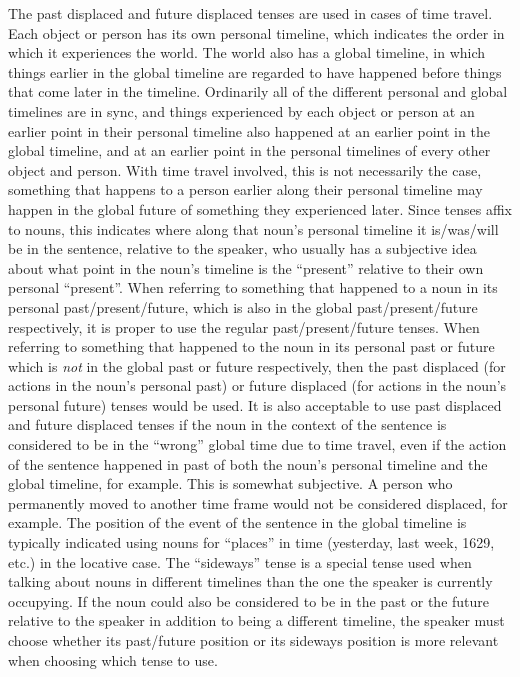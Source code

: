 \documentclass{article}
\begin{document}
The past displaced and future displaced tenses are used in cases of time travel.  Each object or person has its own personal timeline, which indicates the order in which it experiences the world.  The world also has a global timeline, in which things earlier in the global timeline are regarded to have happened before things that come later in the timeline.  Ordinarily all of the different personal and global timelines are in sync, and things experienced by each object or person at an earlier point in their personal timeline also happened at an earlier point in the global timeline, and at an earlier point in the personal timelines of every other object and person.  With time travel involved, this is not necessarily the case, something that happens to a person earlier along their personal timeline may happen in the global future of something they experienced later.  Since tenses affix to nouns, this indicates where along that noun's personal timeline it is/was/will be in the sentence, relative to the speaker, who usually has a subjective idea about what point in the noun's timeline is the ``present'' relative to their own personal ``present''.  When referring to something that happened to a noun in its personal past/present/future, which is also in the global past/present/future respectively, it is proper to use the regular past/present/future tenses.  When referring to something that happened to the noun in its personal past or future which is \emph{not} in the global past or future respectively, then the past displaced (for actions in the noun's personal past) or future displaced (for actions in the noun's personal future) tenses would be used.  It is also acceptable to use past displaced and future displaced tenses if the noun in the context of the sentence is considered to be in the ``wrong'' global time due to time travel, even if the action of the sentence happened in past of both the noun's personal timeline and the global timeline, for example.  This is somewhat subjective.  A person who permanently moved to another time frame would not be considered displaced, for example.  The position of the event of the sentence in the global timeline is typically indicated using nouns for ``places'' in time (yesterday, last week, 1629, etc.) in the locative case. The ``sideways'' tense is a special tense used when talking about nouns in different timelines than the one the speaker is currently occupying. If the noun could also be considered to be in the past or the future relative to the speaker in addition to being a different timeline, the speaker must choose whether its past/future position or its sideways position is more relevant when choosing which tense to use.
\end{document}
